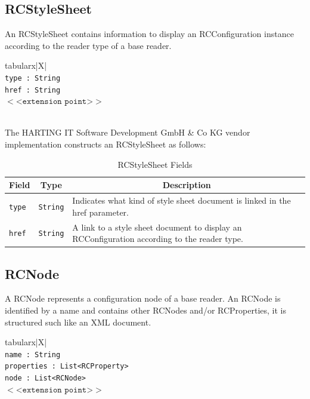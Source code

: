 \documentclass[11pt,a4paper,oneside]{article}
\newenvironment{bbox}%
{\begin{table}[h!]\begin{threeparttable}}%
{\end{threeparttable}\end{table}\FloatBarrier}
\newenvironment{bbox}
{\ifvmode\IgnorePar\fi \EndP\Tg<div class='bbox'>}{\Tg</div>\IgnoreIndent}
\begin{document}
\subsection{RCStyleSheet}
An RCStyleSheet contains information to display an RCConfiguration instance according to the reader type of a base reader.

\begin{bbox}
\begin{edtable}{tabularx}{\linewidth}{|X|}
\hline 
{}
\\
\texttt{type : String }\\
\texttt{href : String}\\
$<$<$\texttt{extension point}$>$>$\\
\texttt{\textendash \textendash \textendash}\\
\hline
\end{edtable}
\end{bbox}

The HARTING IT Software Development GmbH \& Co KG vendor implementation constructs an RCStyleSheet as follows:

\begin{table}[!h]
\begin{tabularx}{\linewidth}{|l|l|X|}
\hline
\multicolumn{1}{|c|}{\textbf{Field}}
&\multicolumn{1}{c|}{\textbf{Type}}&
\multicolumn{1}{c|}{\textbf{Description}}\\
\hline
\texttt{type}&\texttt{String}&Indicates what kind of style sheet document is linked in the href parameter.\\
\hline
\texttt{href}&\texttt{String}&A link to a style sheet document to display an RCConfiguration according to the reader type.\\
\hline
\end{tabularx}
\caption{RCStyleSheet Fields}
\MakeLineNo
\end{table}
\FloatBarrier

\subsection{RCNode}
A RCNode represents a configuration node of a base reader. An RCNode is identified by a name and contains other RCNodes and/or RCProperties, it is structured such like an XML document.

\begin{bbox}
\begin{edtable}{tabularx}{\linewidth}{|X|}
\hline 
{}
\\
\texttt{name : String }\\
\texttt{properties : List<RCProperty>}\\
\texttt{node : List<RCNode>}\\
$<$<$\texttt{extension point}$>$>$\\
\texttt{\textendash \textendash \textendash}\\
\hline
\end{edtable}
\end{bbox}
\end{document}
